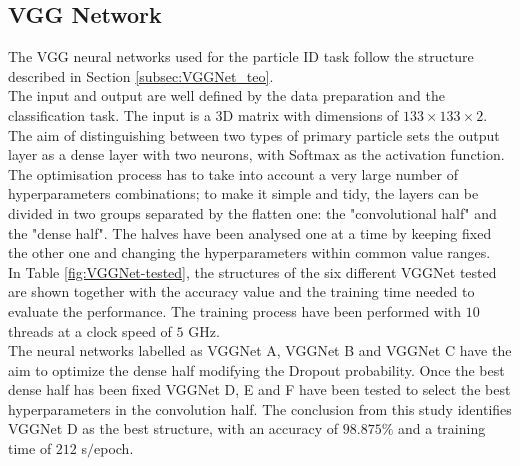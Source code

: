 \subsection{VGG Network}
The VGG neural networks used for the particle ID task follow the structure described in Section \ref{subsec:VGGNet_teo}.\\
The input and output are well defined by the data preparation and the classification task. The input is a 3D matrix with dimensions of $133 \times 133 \times 2$. The aim of distinguishing between two types of primary particle sets the output layer as a dense layer with two neurons, with Softmax as the activation function.\\
The optimisation process has to take into account a very large number of hyperparameters combinations; to make it simple and tidy, the layers can be divided in two groups separated by the flatten one: the "convolutional half" and the "dense half". The halves have been analysed one at a time by keeping fixed the other one and changing the hyperparameters within common value ranges.\\
In Table \ref{fig:VGGNet-tested}, the structures of the six different VGGNet tested are shown together with the accuracy value and the training time needed to evaluate the performance. The training process have been performed with $10$ threads at a clock speed of $5$ GHz.\\
The neural networks labelled as VGGNet A, VGGNet B and VGGNet C have the aim to optimize the dense half modifying the Dropout probability. Once the best dense half has been fixed VGGNet D, E and F have been tested to select the best hyperparameters in the convolution half. The conclusion from this study identifies VGGNet D as the best structure, with an accuracy of $98.875\%$ and a training time of $212$ s$/$epoch.\\

